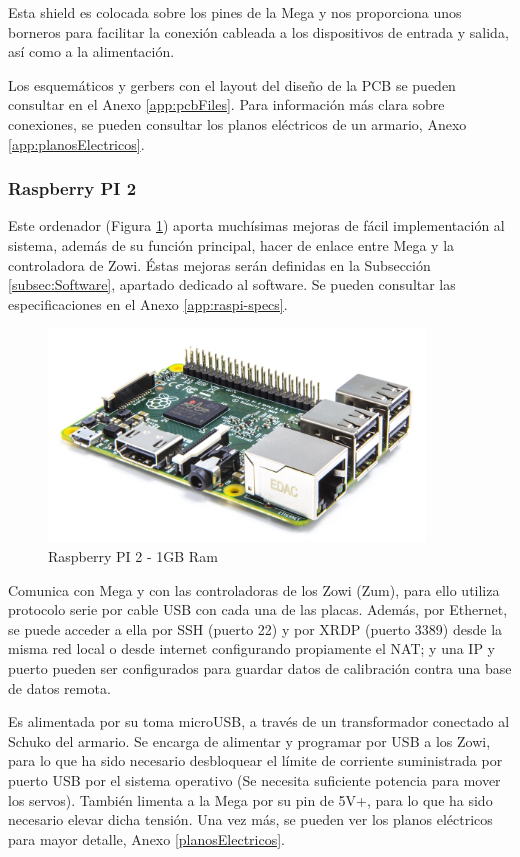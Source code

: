 Esta shield es colocada sobre los pines de la Mega y nos proporciona unos borneros para facilitar la conexión cableada a los dispositivos de entrada y salida, así como a la alimentación.

Los esquemáticos y gerbers con el layout del diseño de la PCB se pueden consultar en el Anexo \ref{app:pcbFiles}. Para información más clara sobre conexiones, se pueden consultar los planos eléctricos de un armario, Anexo \ref{app:planosElectricos}.

\subsubsection{Raspberry PI 2}

Este ordenador (Figura \ref{fig:raspi}) aporta muchísimas mejoras de fácil implementación al sistema, además de su función principal, hacer de enlace entre Mega y la controladora de Zowi. Éstas mejoras serán definidas en la Subsección \ref{subsec:Software}, apartado dedicado al software. Se pueden consultar las especificaciones en el Anexo \ref{app:raspi-specs}.

\begin{figure}
\centering
\includegraphics[width=100mm]{Figures/raspi}
\caption{Raspberry PI 2 - 1GB Ram}
\label{fig:raspi}
\end{figure}

Comunica con Mega y con las controladoras de los Zowi (Zum), para ello utiliza protocolo serie por cable USB con cada una de las placas. Además, por Ethernet, se puede acceder a ella por SSH (puerto 22) y por XRDP (puerto 3389) desde la misma red local o desde internet configurando propiamente el NAT; y una IP y puerto pueden ser configurados para guardar datos de calibración contra una base de datos remota.

Es alimentada por su toma microUSB, a través de un transformador conectado al Schuko del armario. Se encarga de alimentar y programar por USB a los Zowi, para lo que ha sido necesario desbloquear el límite de corriente suministrada por puerto USB por el sistema operativo (Se necesita suficiente potencia para mover los servos). También limenta a la Mega por su pin de 5V+, para lo que ha sido necesario elevar dicha tensión. Una vez más, se pueden ver los planos eléctricos para mayor detalle, Anexo \ref{planosElectricos}.

